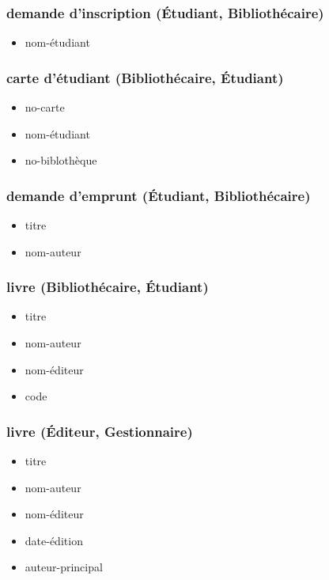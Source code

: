 \subsubsection*{demande d'inscription (Étudiant, Bibliothécaire)}
\begin{itemize}
    \item nom-étudiant
\end{itemize}

\subsubsection*{carte d'étudiant (Bibliothécaire, Étudiant)}
\begin{itemize}
    \item no-carte
    \item nom-étudiant
    \item no-biblothèque
\end{itemize}

\subsubsection*{demande d'emprunt (Étudiant, Bibliothécaire)}
\begin{itemize}
    \item titre
    \item nom-auteur
\end{itemize}

\subsubsection*{livre (Bibliothécaire, Étudiant)}
\begin{itemize}
    \item titre
    \item nom-auteur
    \item nom-éditeur
    \item code
\end{itemize}

\subsubsection*{livre (Éditeur, Gestionnaire)}
\begin{itemize}
    \item titre
    \item nom-auteur
    \item nom-éditeur
    \item date-édition
    \item auteur-principal
\end{itemize}


